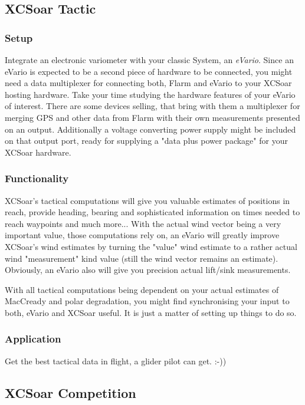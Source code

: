 \subsection*{XCSoar Tactic}
\subsubsection*{Setup} Integrate an electronic variometer with your classic 
System, an \emph{eVario}. Since an eVario is expected to be a second piece of 
hardware to be connected, you might need a data multiplexer for connecting both, 
Flarm and eVario to your XCSoar hosting hardware. Take your time studying the 
hardware features of your eVario of interest. There are some devices selling, 
that bring with them a multiplexer for merging GPS and other data from Flarm with 
their own measurements presented on an output. Additionally a voltage converting 
power supply might be included on that output port, ready for supplying a "data 
plus power package" for your XCSoar hardware.

\subsubsection*{Functionality} XCSoar's tactical computations will give you 
valuable estimates of positions in reach, provide heading, bearing and 
sophisticated information on times needed to reach waypoints and much more... 
With the actual wind vector being a very important value, those computations rely 
on, an eVario will greatly improve XCSoar's wind estimates by turning the "value" 
wind estimate to a rather actual wind "measurement" kind value (still the wind 
vector remains an estimate). Obviously, an eVario also will give you precision 
actual lift/sink measurements.

With all tactical computations being dependent on your actual estimates of 
MacCready and polar degradation, you might find synchronising your input to both, 
eVario and XCSoar useful. It is just a matter of setting up things to do so.

\subsubsection*{Application} Get the best tactical data in flight, a glider pilot 
can get. :-))

\subsection*{XCSoar Competition}
